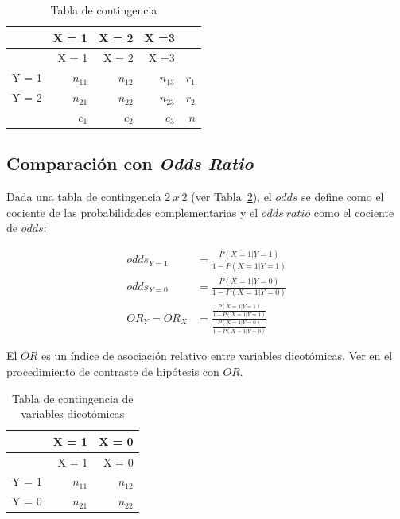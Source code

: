 \documentclass[
  12pt,
  a4paper,
  extrafontsizes,
  onecolumn,
  openright,
  table]{memoir}
\begin{document}
\hypertarget{tbl-contingencia}{}
\begin{longtable}[]{@{}lrrrr@{}}
\caption{\label{tbl-contingencia}Tabla de contingencia}\tabularnewline
\toprule\noalign{}
& X = 1 & X = 2 & X =3 & \\
\midrule\noalign{}
\endfirsthead
\toprule\noalign{}
& X = 1 & X = 2 & X =3 & \\
\midrule\noalign{}
\endhead
\bottomrule\noalign{}
\endlastfoot
Y = 1 & \(n_{11}\) & \(n_{12}\) & \(n_{13}\) & \(r_1\) \\
Y = 2 & \(n_{21}\) & \(n_{22}\) & \(n_{23}\) & \(r_2\) \\
& \(c_1\) & \(c_2\) & \(c_3\) & \(n\) \\
\end{longtable}

\hypertarget{sec-or}{%
\subsection{\texorpdfstring{Comparación con \emph{Odds
Ratio}}{Comparación con Odds Ratio}}\label{sec-or}}

Dada una tabla de contingencia \(2\ x\ 2\) (ver
Tabla~\ref{tbl-contingencia-3}), el \(odds\) se define como el cociente
de las probabilidades complementarias y el \(odds\ ratio\) como el
cociente de \(odds\):

\[
\begin{aligned}
odds_{Y=1} &= \frac{P(X=1|Y=1)}{1-P(X=1|Y=1)}\\
odds_{Y=0} &= \frac{P(X=1|Y=0)}{1-P(X=1|Y=0)}\\
OR_Y = OR_X &=\frac{\frac{P(X=1|Y=1)}{1-P(X=1|Y=1)}}{\frac{P(X=1|Y=0)}{1-P(X=1|Y=0)}}
\end{aligned}
\]

El \(OR\) es un índice de asociación relativo entre variables
dicotómicas. Ver en \textcite{leton2021} el procedimiento de contraste
de hipótesis con \(OR\).

\hypertarget{tbl-contingencia-3}{}
\begin{longtable}[]{@{}lrr@{}}
\caption{\label{tbl-contingencia-3}Tabla de contingencia de variables
dicotómicas}\tabularnewline
\toprule\noalign{}
& X = 1 & X = 0 \\
\midrule\noalign{}
\endfirsthead
\toprule\noalign{}
& X = 1 & X = 0 \\
\midrule\noalign{}
\endhead
\bottomrule\noalign{}
\endlastfoot
Y = 1 & \(n_{11}\) & \(n_{12}\) \\
Y = 0 & \(n_{21}\) & \(n_{22}\) \\
\end{longtable}
\end{document}
